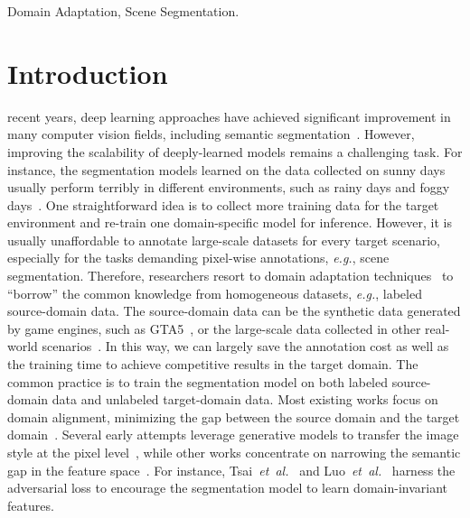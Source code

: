 \documentclass[journal]{IEEEtran}
\def\eg{\emph{e.g.}}
\def\etal{\emph{et~al.}}
\begin{document}
\begin{IEEEkeywords}
Domain Adaptation, Scene Segmentation.
\end{IEEEkeywords}

\section{Introduction}
 recent years, deep learning approaches have achieved significant improvement in many computer vision fields, including  semantic segmentation~\cite{zhao2017pyramid,chen2017deeplab}. However, improving the scalability of deeply-learned models remains a challenging task. For instance, the segmentation models learned on the data collected on sunny days usually perform terribly in different environments, such as rainy days and foggy days~\cite{wu2019ace, wang2019learning}. One straightforward idea is to collect more training data for the target environment and re-train one domain-specific model for inference. However, it is usually unaffordable to annotate large-scale datasets for every target scenario, especially for the tasks demanding pixel-wise annotations, \eg, scene segmentation.  Therefore, researchers resort to domain adaptation techniques~\cite{wang2019learning,pan2019transferrable,xiang2020unsupervised} to ``borrow'' the common knowledge from homogeneous datasets, \eg, labeled source-domain data. The source-domain data can be the synthetic data generated by game engines, such as GTA5~\cite{xiang2020unsupervised, richter2016playing}, or the large-scale data collected in other real-world scenarios~\cite{cordts2016cityscapes}. In this way, we can largely save the annotation cost as well as the training time to achieve competitive results in the target domain. The common practice is to train the segmentation model on both labeled source-domain data and unlabeled target-domain data. Most existing works focus on domain alignment, minimizing the gap between the source domain and the target domain~\cite{chen2019learning,chen2019crdoco,vu2019dada}. Several early attempts leverage generative models to transfer the image style at the pixel level~\cite{hoffman2018cycada,wu2018dcan}, while other works concentrate on narrowing the semantic gap in the feature space~\cite{geng2011daml}. For instance, Tsai~\etal~\cite{tsai2018learning,tsai2019domain} and Luo~\etal~\cite{luo2019significance,luo2019taking} harness the adversarial loss to encourage the segmentation model to learn domain-invariant features.  
\end{document}
